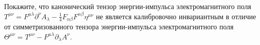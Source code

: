 \documentclass[__main__.tex]{subfiles}
\begin{document}
Покажите, что канонический тензор энергии-импульса электромагнитного поля $T^{\mu\nu}=F^{\mu\lambda}\partial^{\nu}A_{\lambda}-\frac{1}{4}F_{\alpha\beta}F^{\alpha\beta}\eta^{\mu\nu}$ не является калибровочно инвариантным в отличие от симметризованного тензора энергии-импульса электромагнитного поля $\Theta^{\mu\nu}=T^{\mu\nu}-F^{\mu\lambda}\partial_{\lambda}A^{\nu}$.\\ 

\end{document}
